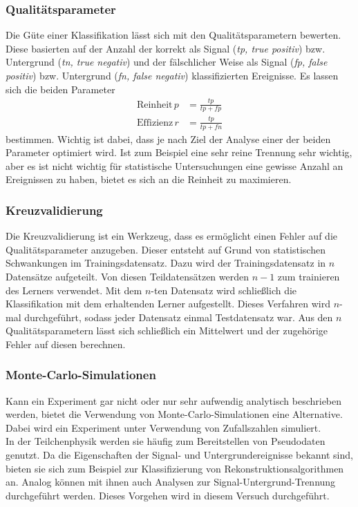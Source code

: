 \subsubsection{Qualitätsparameter}
Die Güte einer Klassifikation lässt sich mit den Qualitätsparametern bewerten. Diese basierten auf der Anzahl der korrekt als Signal (\textit{tp, true positiv}) bzw. Untergrund (\textit{tn, true negativ}) und der fälschlicher Weise als Signal (\textit{fp, false positiv}) bzw. Untergrund (\textit{fn, false negativ}) klassifizierten Ereignisse. Es lassen sich die beiden Parameter
\begin{align}
	\text{Reinheit}\, p &= \frac{tp}{tp+fp}\\
	\text{Effizienz}\, r &= \frac{tp}{tp+fn}
\end{align}
bestimmen. Wichtig ist dabei, dass je nach Ziel der Analyse einer der beiden Parameter optimiert wird. Ist zum Beispiel eine sehr reine Trennung sehr wichtig, aber es ist nicht wichtig für statistische Untersuchungen eine gewisse Anzahl an Ereignissen zu haben, bietet es sich an die Reinheit zu maximieren.
\subsubsection{Kreuzvalidierung}
Die Kreuzvalidierung ist ein Werkzeug, dass es ermöglicht einen Fehler auf die Qualitätsparameter anzugeben. Dieser entsteht auf Grund von statistischen Schwankungen im Trainingsdatensatz. Dazu wird der Trainingsdatensatz in $n$ Datensätze aufgeteilt. Von diesen Teildatensätzen werden $n-1$ zum trainieren des Lerners verwendet. Mit dem $n$-ten Datensatz wird schließlich die Klassifikation mit dem erhaltenden Lerner aufgestellt. Dieses Verfahren wird $n$-mal durchgeführt, sodass jeder Datensatz einmal Testdatensatz war. Aus den $n$ Qualitätsparametern lässt sich schließlich ein Mittelwert und der zugehörige Fehler auf diesen berechnen.
\subsubsection{Monte-Carlo-Simulationen}
Kann ein Experiment gar nicht oder nur sehr aufwendig analytisch beschrieben werden, bietet die Verwendung von Monte-Carlo-Simulationen eine Alternative. Dabei wird ein Experiment unter Verwendung von Zufallszahlen simuliert. \\
In der Teilchenphysik werden sie häufig zum Bereitstellen von Pseudodaten genutzt. Da die Eigenschaften der Signal- und Untergrundereignisse bekannt sind, bieten sie sich zum Beispiel zur Klassifizierung von Rekonstruktionsalgorithmen an. Analog können mit ihnen auch Analysen zur Signal-Untergrund-Trennung durchgeführt werden. Dieses Vorgehen wird in diesem Versuch durchgeführt.
